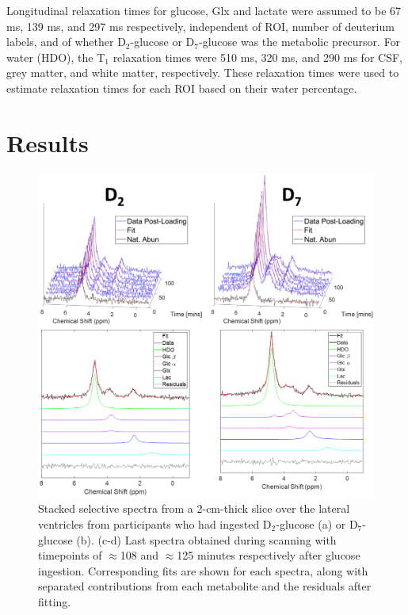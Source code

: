 \documentclass[class=article, crop=false]{standalone}
\begin{document}
Longitudinal relaxation times for glucose, Glx and lactate were assumed to be 67 ms, 139 ms, and 297 ms respectively\cite{DeFeyter2018DeuteriumVivo}, independent of ROI, number of deuterium labels, and of whether D$_2$-glucose or D$_7$-glucose was the metabolic precursor. For water (HDO), the T$_1$ relaxation times were 510 ms, 320 ms, and 290 ms for CSF, grey matter, and white matter, respectively\cite{Cocking2023DeuteriumDosing}. These relaxation times were used to estimate relaxation times for each ROI based on their water percentage.

\section{Results}

\begin{figure}
    \centering
    \includegraphics[width = 1\textwidth]{Figures/Glucose/Selective.png}
    \caption{Stacked selective spectra from a 2-cm-thick slice over the lateral ventricles from participants who had ingested D$_2$-glucose (a) or D$_7$-glucose (b). (c-d) Last spectra obtained during scanning with timepoints of $\approx$108 and $\approx$125 minutes respectively after glucose ingestion. Corresponding fits are shown for each spectra, along with separated contributions from each metabolite and the residuals after fitting.}
    \label{fig:Glu:Select}
\end{figure}
\end{document}
